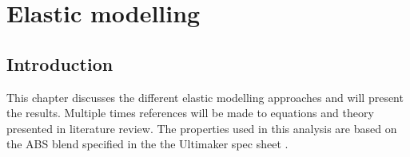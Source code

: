 \chapter{Elastic modelling}
\label{chp:Elasticmodelling}
\graphicspath{{chapter_6_Elasticmodelling/figures/chapter_6.tex}}%

\section{Introduction}
This chapter discusses the different elastic modelling approaches and will present the results. Multiple times references will be made to equations and theory presented in literature review. The properties used in this analysis are based on the ABS blend specified in the the Ultimaker spec sheet \cite{UltimakerUltimakerSheet}.







